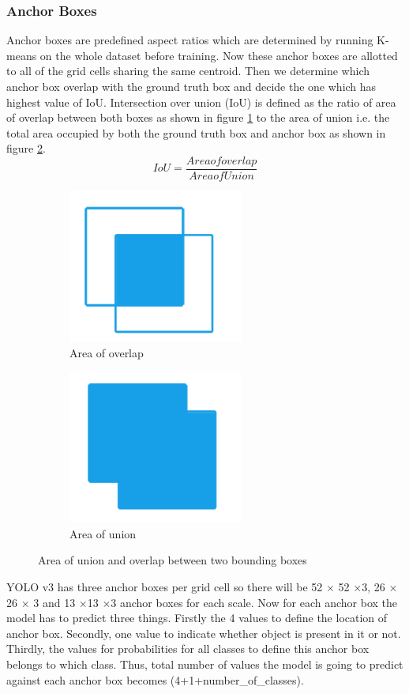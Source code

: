 \subsubsection{Anchor Boxes}
Anchor boxes are predefined aspect ratios which are determined by running K-means on the whole dataset before training. Now these anchor boxes are allotted to all of the grid cells sharing the same centroid. Then we determine which anchor box overlap with the ground truth box and decide the one which has highest value of IoU. Intersection over union (IoU) is defined as the ratio of area of overlap between both boxes as shown in figure \ref{fig:5.4a} to the area of union i.e. the total area occupied by both the ground truth box and anchor box as shown in figure \ref{fig:5.4b}.
\begin{equation}
    IoU = \frac{Area of overlap}{Area of Union}
\end{equation}

  \begin{figure}[H]
  \centering
  \begin{subfigure}[t]{0.3\textwidth}
      \includegraphics[scale = 0.7]{CHAPTERS/Chapter-5/images/5.4a.PNG}
      \caption{Area of overlap}
      \label{fig:5.4a}
  \end{subfigure}
  \begin{subfigure}[t]{0.3\textwidth}
      \includegraphics[scale = 0.7]{CHAPTERS/Chapter-5/images/5.4b.PNG}
      \caption{Area of union}
      \label{fig:5.4b}
  \end{subfigure}
  \caption[]{Area of union and overlap between two bounding boxes}
  \label{fig:11.4}
\end{figure}
YOLO v3 has three anchor boxes per grid cell so there will be 52 $\times$ 52 $\times$3, 26 $\times$ 26 $\times$ 3 and 13 $\times$13 $\times$3 anchor boxes for each scale. Now for each anchor box the model has to predict three things. Firstly the 4 values to define the location of anchor box. Secondly, one value to indicate whether object is present in it or not. Thirdly, the values for probabilities  for all classes to define this anchor box belongs to which class. Thus, total number of values the model is going to predict against each anchor box becomes (4+1+number\_of\_classes). 
